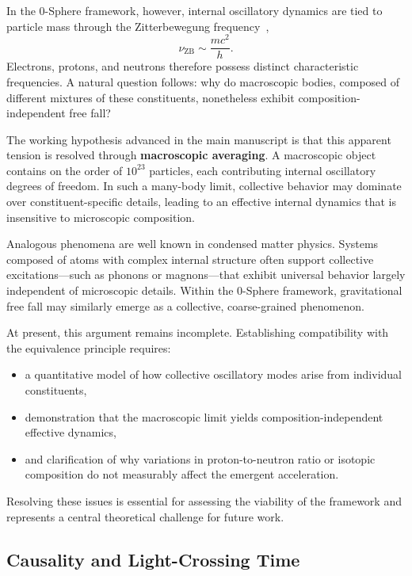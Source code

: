 \documentclass[12pt,letterpaper]{article}
\begin{document}
In the 0-Sphere framework, however, internal oscillatory dynamics are tied to particle mass through the Zitterbewegung frequency~\cite{Hanamura2026geometrical},
\begin{equation}
\nu_\text{ZB} \sim \frac{m c^2}{h}.
\end{equation}
Electrons, protons, and neutrons therefore possess distinct characteristic frequencies. A natural question follows: why do macroscopic bodies, composed of different mixtures of these constituents, nonetheless exhibit composition-independent free fall?

The working hypothesis advanced in the main manuscript is that this apparent tension is resolved through \textbf{macroscopic averaging}. A macroscopic object contains on the order of $10^{23}$ particles, each contributing internal oscillatory degrees of freedom. In such a many-body limit, collective behavior may dominate over constituent-specific details, leading to an effective internal dynamics that is insensitive to microscopic composition.

Analogous phenomena are well known in condensed matter physics. Systems composed of atoms with complex internal structure often support collective excitations—such as phonons or magnons—that exhibit universal behavior largely independent of microscopic details. Within the 0-Sphere framework, gravitational free fall may similarly emerge as a collective, coarse-grained phenomenon.

At present, this argument remains incomplete. Establishing compatibility with the equivalence principle requires:
\begin{itemize}
\item a quantitative model of how collective oscillatory modes arise from individual constituents,
\item demonstration that the macroscopic limit yields composition-independent effective dynamics,
\item and clarification of why variations in proton-to-neutron ratio or isotopic composition do not measurably affect the emergent acceleration.
\end{itemize}

Resolving these issues is essential for assessing the viability of the framework and represents a central theoretical challenge for future work.


\subsection{Causality and Light-Crossing Time}
\label{subsec:causality}
\end{document}

